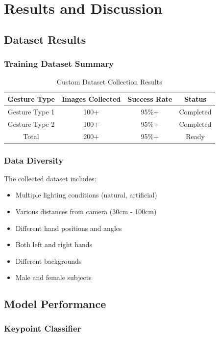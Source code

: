 \chapter{Results and Discussion}

\section{Dataset Results}

\subsection{Training Dataset Summary}

\begin{table}[H]
\centering
\begin{tabular}{|c|c|c|c|}
\hline
\textbf{Gesture Type} & \textbf{Images Collected} & \textbf{Success Rate} & \textbf{Status} \\
\hline
Gesture Type 1 & 100+ & 95\%+ & Completed \\
\hline
Gesture Type 2 & 100+ & 95\%+ & Completed \\
\hline
Total & 200+ & 95\%+ & Ready \\
\hline
\end{tabular}
\caption{Custom Dataset Collection Results}
\end{table}

\subsection{Data Diversity}

The collected dataset includes:
\begin{itemize}
    \item Multiple lighting conditions (natural, artificial)
    \item Various distances from camera (30cm - 100cm)
    \item Different hand positions and angles
    \item Both left and right hands
    \item Different backgrounds
    \item Male and female subjects
\end{itemize}

\section{Model Performance}

\subsection{Keypoint Classifier}

